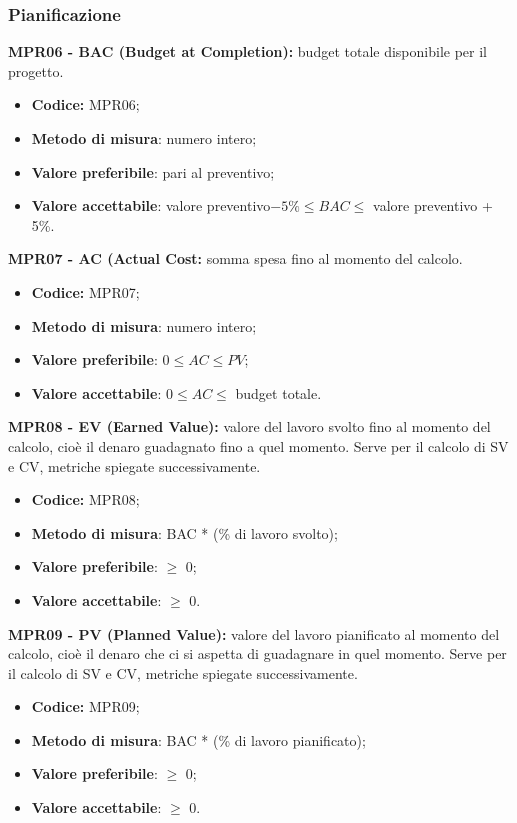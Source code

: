\subsubsection{Pianificazione}
\textbf{MPR06 - BAC (Budget at Completion):} budget totale disponibile per il progetto.
\begin{itemize}
    \item \textbf{Codice:} MPR06;
    \item \textbf{Metodo di misura}: numero intero;
    \item \textbf{Valore preferibile}: pari al preventivo;
    \item \textbf{Valore accettabile}: valore preventivo$ - 5\% \leq BAC \leq$ valore preventivo + 5\%.
\end{itemize}
\textbf{MPR07 - AC (Actual Cost:} somma spesa fino al momento del calcolo.
\begin{itemize}
    \item \textbf{Codice:} MPR07;
    \item \textbf{Metodo di misura}: numero intero;
    \item \textbf{Valore preferibile}: $0 \leq AC \leq PV$;
    \item \textbf{Valore accettabile}: $0 \leq AC \leq$ budget totale.
\end{itemize}
\textbf{MPR08 - EV (Earned Value):} valore del lavoro svolto fino al momento del calcolo, cioè il denaro guadagnato fino a quel momento.
Serve per il calcolo di SV e CV, metriche spiegate successivamente.
\begin{itemize}
    \item \textbf{Codice:} MPR08;
    \item \textbf{Metodo di misura}: BAC * (\% di lavoro svolto);
    \item \textbf{Valore preferibile}: $\geq$ 0;
    \item \textbf{Valore accettabile}: $\geq$ 0.
\end{itemize}
\textbf{MPR09 - PV (Planned Value):} valore del lavoro pianificato al momento del calcolo, cioè il denaro che ci si aspetta di guadagnare in quel momento.
Serve per il calcolo di SV e CV, metriche spiegate successivamente.
\begin{itemize}
    \item \textbf{Codice:} MPR09;
    \item \textbf{Metodo di misura}: BAC * (\% di lavoro pianificato);
    \item \textbf{Valore preferibile}: $\geq$ 0;
    \item \textbf{Valore accettabile}: $\geq$ 0.
\end{itemize}
